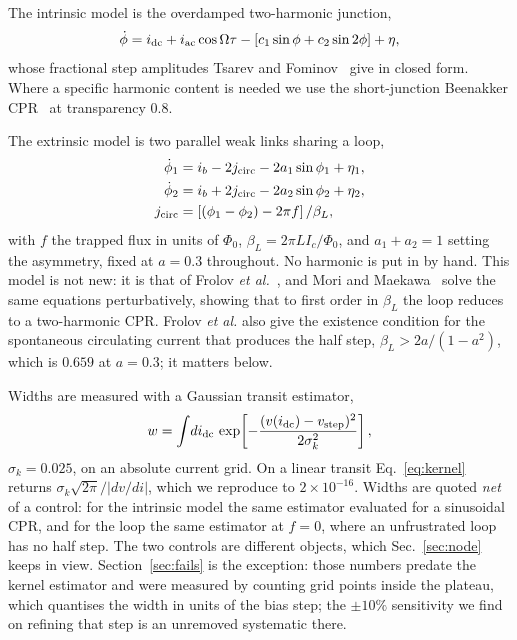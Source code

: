 \documentclass[aps,prb,twocolumn,superscriptaddress,floatfix,nofootinbib]{revtex4-2}
\begin{document}
The intrinsic model is the overdamped two-harmonic junction,
\begin{equation}
  \dot\phi = i_{\rm dc} + i_{\rm ac}\cos\Omega\tau
             - \left[c_1\sin\phi + c_2\sin 2\phi\right] + \eta ,
  \label{eq:intrinsic}
\end{equation}
whose fractional step amplitudes Tsarev and Fominov~\cite{Tsarev2025} give in
closed form. Where a specific harmonic content is needed we use the
short-junction Beenakker CPR~\cite{Beenakker1991} at transparency $0.8$.

The extrinsic model is two parallel weak links sharing a loop,
\begin{align}
  \dot\phi_1 &= i_b - 2 j_{\rm circ} - 2a_1\sin\phi_1 + \eta_1 ,\nonumber\\
  \dot\phi_2 &= i_b + 2 j_{\rm circ} - 2a_2\sin\phi_2 + \eta_2 ,
  \label{eq:extrinsic}\\
  j_{\rm circ} &= \left[(\phi_1-\phi_2) - 2\pi f\right]/\beta_L ,\nonumber
\end{align}
with $f$ the trapped flux in units of $\Phi_0$,
$\beta_L = 2\pi L I_c/\Phi_0$, and $a_1+a_2=1$ setting the asymmetry, fixed at
$a=0.3$ throughout. No harmonic is put in by hand. This model is not new: it is
that of Frolov \emph{et al.}~\cite{Frolov2006}, and Mori and
Maekawa~\cite{Mori2021} solve the same equations perturbatively, showing that to
first order in $\beta_L$ the loop reduces to a two-harmonic CPR. Frolov
\emph{et al.} also give the existence condition for the spontaneous circulating
current that produces the half step, $\beta_L > 2a/(1-a^2)$, which is $0.659$ at
$a=0.3$; it matters below.

Widths are measured with a Gaussian transit estimator,
\begin{equation}
  w = \int \! di_{\rm dc}\,
      \exp\!\left[-\frac{(v(i_{\rm dc})-v_{\rm step})^2}{2\sigma_k^2}\right] ,
  \label{eq:kernel}
\end{equation}
$\sigma_k=0.025$, on an absolute current grid. On a linear transit
Eq.~\eqref{eq:kernel} returns $\sigma_k\sqrt{2\pi}/|dv/di|$, which we reproduce
to $2\times10^{-16}$. Widths are quoted \emph{net} of a control: for the
intrinsic model the same estimator evaluated for a sinusoidal CPR, and for the
loop the same estimator at $f=0$, where an unfrustrated loop has no half step.
The two controls are different objects, which Sec.~\ref{sec:node} keeps in
view. Section~\ref{sec:fails} is the exception: those numbers predate the
kernel estimator and were measured by counting grid points inside the plateau,
which quantises the width in units of the bias step; the $\pm10\%$ sensitivity
we find on refining that step is an unremoved systematic there.
\end{document}
